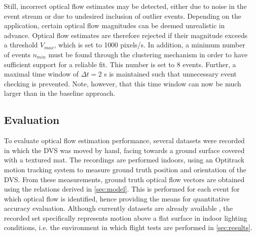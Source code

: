 Still, incorrect optical flow estimates may be detected, either due to noise in the event stream or due to undesired inclusion of outlier events. Depending on the application, certain optical flow magnitudes can be deemed unrealistic in advance. Optical flow estimates are therefore rejected if their magnitude exceeds a threshold $V_{max}$, which is set to 1000 pixels/s. In addition, a minimum number of events $n_{min}$ must be found through the clustering mechanism in order to have sufficient support for a reliable fit. This number is set to 8 events. Further, a maximal time window of $\Delta t=2$ s is maintained such that unnecessary event checking is prevented. Note, however, that this time window can now be much larger than in the baseline approach. 

%
%	

\subsection{Evaluation}
\label{sec:results_optical_flow}
To evaluate optical flow estimation performance, several datasets were recorded in which the DVS was moved by hand, facing towards a ground surface covered with a textured mat. The recordings are performed indoors, using an Optitrack motion tracking system to measure ground truth position and orientation of the DVS. From these measurements, ground truth optical flow vectors are obtained using the relations derived in \cref{sec:model}. This is performed for each event for which optical flow is identified, hence providing the means for quantitative accuracy evaluation. Although currently datasets are already available \cite{Barranco2016,Ruckauer2016}, the recorded set specifically represents motion above a flat surface in indoor lighting conditions, i.e. the environment in which flight tests are performed in \cref{sec:results}.

